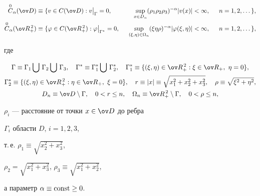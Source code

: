 \begin{alignat*}{3}


\OC_\alpha(\ov D)&\equiv\{v\in C(\ov D):v\big|_\Gamma=0, &\ \;


\sup_{x\in D_n}(\rho_1\rho_2\rho_3)^{-\alpha}|v(x)|&<\infty,


& \ \; n&=1,2,\dotsc\}, \\


\OC_\alpha(\ov R^{\,2}_+)&\equiv\{\varphi\in C(\ov R^{\,2}_+):


\varphi\big|_{\Gamma^*}=0, &\ \; \sup_{(\xi,\eta)\in\Omega_n}


(\xi\eta\rho)^{-\alpha}|\varphi(\xi,\eta)|&<\infty, &\ \;


n&=1,2,\dotsc\},


\end{alignat*}


где


\begin{gather*}


\Gamma\equiv\Gamma_1\bigcup\,\Gamma_2\bigcup\,\Gamma_3,\quad


\Gamma^*\equiv\Gamma^*_1\bigcup\,\Gamma^*_2,\quad


\Gamma^*_1\equiv\{(\xi,\eta)\in\ov R^{\,2}_+:


\xi\in\ov R_+,\ \eta=0\}, \\


%


\Gamma^*_2\equiv\{(\xi,\eta)\in\ov R^{\,2}_+:\eta\in\ov R_+, \


\xi=0\},\quad r\equiv|x|\equiv\sqrt{x^2_1+x^2_2+x^2_3},\quad


\rho\equiv\sqrt{\xi^2+\eta^2}, \\


%


D_n\equiv\ov D\setminus\Gamma,\quad 0<r\le n,\quad


\Omega_n\equiv\ov R^{\,2}_+\setminus\Gamma,\quad 0<\rho\le n,


\end{gather*}


$\rho_i$ --- расстояние от точки $x\in\ov D$ до ребра


$\Gamma_i$ области $D$, $i=1,2,3$,


т.\,е. $\rho_1\equiv\sqrt{x^2_2+x^2_3}$,


$\rho_2=\sqrt{x^2_1+x^2_3}$, $\rho_3\equiv\sqrt{x^2_1+x^2_2}$,


а параметр $\alpha\equiv\operatorname{const}\ge 0$.





